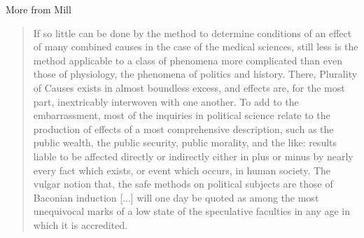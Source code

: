 \documentclass{beamer}
\numberwithin{equation}{section}
\begin{document}
\begin{frame}{More from Mill}

\small

\begin{quote}

If so little can be done by the method to determine conditions of an effect of many combined causes in the case of the medical sciences, still less is the method applicable to a class of phenomena more complicated than even those of physiology, the phenomena of politics and history. There, Plurality of Causes exists in almost boundless excess, and effects are, for the most part, inextricably interwoven with one another. To add to the embarrassment, most of the inquiries in political science relate to the production of effects of a most comprehensive description, such as the public wealth, the public security, public morality, and the like: results liable to be affected directly or indirectly either in plus or minus by nearly every fact which exists, or event which occurs, in human society. \alert{The vulgar notion that, the safe methods on political subjects are those of Baconian induction [...] will one day be quoted as among the most unequivocal marks of a low state of the speculative faculties in any age in which it is accredited.} 
\end{quote}

%

%
%

\end{frame}
\end{document}
